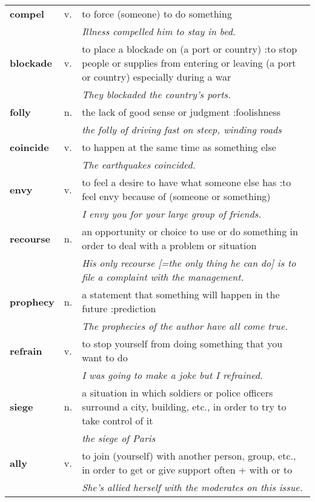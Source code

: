 \documentclass[a4paper]{article}
\begin{document}
\begin{longtable}{llp{11cm}}
\textbf{compel} & v. &  to force (someone) to do something \\
 & & \textit{Illness compelled him to stay in bed.}\\[0.08cm]
\textbf{blockade} & v. &  to place a blockade on (a port or country) :to stop people or supplies from entering or leaving (a port or country) especially during a war \\
 & & \textit{They blockaded the country's ports.}\\[0.08cm]
\textbf{folly} & n. &  the lack of good sense or judgment :foolishness \\
 & & \textit{the folly of driving fast on steep, winding roads}\\[0.08cm]
\textbf{coincide} & v. &  to happen at the same time as something else \\
 & & \textit{The earthquakes coincided.}\\[0.08cm]
\textbf{envy} & v. &  to feel a desire to have what someone else has :to feel envy because of (someone or something) \\
 & & \textit{I envy you for your large group of friends.}\\[0.08cm]
\textbf{recourse} & n. &  an opportunity or choice to use or do something in order to deal with a problem or situation \\
 & & \textit{His only recourse [=the only thing he can do] is to file a complaint with the management.}\\[0.08cm]
\textbf{prophecy} & n. &  a statement that something will happen in the future :prediction \\
 & & \textit{The prophecies of the author have all come true.}\\[0.08cm]
\textbf{refrain} & v. &  to stop yourself from doing something that you want to do \\
 & & \textit{I was going to make a joke but I refrained.}\\[0.08cm]
\textbf{siege} & n. &  a situation in which soldiers or police officers surround a city, building, etc., in order to try to take control of it \\
 & & \textit{the siege of Paris}\\[0.08cm]
\textbf{ally} & v. &  to join (yourself) with another person, group, etc., in order to get or give support often + with or to \\
 & & \textit{She's allied herself with the moderates on this issue.}\\[0.08cm]
\end{longtable}
\end{document}
